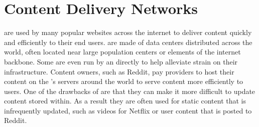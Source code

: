 \section{Content Delivery Networks}\label{sec:background_cdns}

\CDNs are used by many popular websites across the internet to deliver content quickly and efficiently to their end users. \CDNs are made of data centers distributed across the world, often located near large population centers or elements of the internet backbone. Some \cdns are even run by an \isp directly to help alleviate strain on their infrastructure. Content owners, such as Reddit, pay \cdn providers to host their content on the \cdn's servers around the world to serve content more efficiently to users. One of the drawbacks of \cdns are that they can make it more difficult to update content stored within. As a result they are often used for static content that is infrequently updated, such as videos for Netflix or user content that is posted to Reddit.